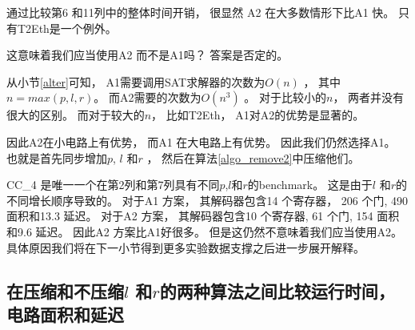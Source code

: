 通过比较第6 和11列中的整体时间开销，
很显然
A2 在大多数情形下比A1 快。
只有T2Eth是一个例外。

这意味着我们应当使用A2 而不是A1吗？
答案是否定的。

从小节\ref{alter}可知，
A1需要调用SAT求解器的次数为$O(n)$ ，
其中$n=max(p,l,r)$。
而A2需要的次数为$O(n^3)$ 。
对于比较小的$n$，
两者并没有很大的区别。
而对于较大的$n$，
比如T2Eth，
A1对A2的优势是显著的。

因此A2在小电路上有优势，
而A1 在大电路上有优势。
因此我们仍然选择A1。
也就是首先同步增加$p$, $l$ 和$r$ ，
然后在算法\ref{algo_remove2}中压缩他们。

CC\_4 是唯一一个在第2列和第7列具有不同$p$,$l$和$r$的benchmark。
这是由于$l$ 和$r$的不同增长顺序导致的。
对于A1 方案，
其解码器包含14 个寄存器， 206 个门, 490 面积和13.3 延迟。
对于A2 方案，
其解码器包含10 个寄存器, 61 个门, 154 面积和9.6 延迟。
因此A2 方案比A1好很多。
但是这仍然不意味着我们应当使用A2。
具体原因我们将在下一小节得到更多实验数据支撑之后进一步展开解释。

\subsection{在压缩和不压缩$l$ 和$r$的两种算法之间比较运行时间，电路面积和延迟}\label{subsec_min}

